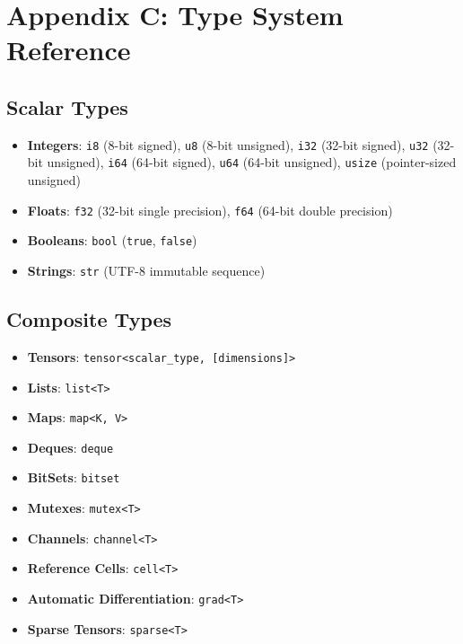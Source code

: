 \documentclass[
  english,
]{book}
\providecommand{\tightlist}{%
  \setlength{\itemsep}{0pt}\setlength{\parskip}{0pt}}
\begin{document}
\section{Appendix C: Type System
Reference}\label{appendix-c-type-system-reference}

\subsection{Scalar Types}\label{scalar-types}

\begin{itemize}
\tightlist
\item
  \textbf{Integers}: \texttt{i8} (8-bit signed), \texttt{u8} (8-bit
  unsigned), \texttt{i32} (32-bit signed), \texttt{u32} (32-bit
  unsigned), \texttt{i64} (64-bit signed), \texttt{u64} (64-bit
  unsigned), \texttt{usize} (pointer-sized unsigned)
\item
  \textbf{Floats}: \texttt{f32} (32-bit single precision), \texttt{f64}
  (64-bit double precision)
\item
  \textbf{Booleans}: \texttt{bool} (\texttt{true}, \texttt{false})
\item
  \textbf{Strings}: \texttt{str} (UTF-8 immutable sequence)
\end{itemize}

\subsection{Composite Types}\label{composite-types}

\begin{itemize}
\tightlist
\item
  \textbf{Tensors}:
  \texttt{tensor\textless{}scalar\_type,\ {[}dimensions{]}\textgreater{}}
\item
  \textbf{Lists}: \texttt{list\textless{}T\textgreater{}}
\item
  \textbf{Maps}: \texttt{map\textless{}K,\ V\textgreater{}}
\item
  \textbf{Deques}: \texttt{deque}
\item
  \textbf{BitSets}: \texttt{bitset}
\item
  \textbf{Mutexes}: \texttt{mutex\textless{}T\textgreater{}}
\item
  \textbf{Channels}: \texttt{channel\textless{}T\textgreater{}}
\item
  \textbf{Reference Cells}: \texttt{cell\textless{}T\textgreater{}}
\item
  \textbf{Automatic Differentiation}:
  \texttt{grad\textless{}T\textgreater{}}
\item
  \textbf{Sparse Tensors}: \texttt{sparse\textless{}T\textgreater{}}
\end{itemize}
\end{document}
